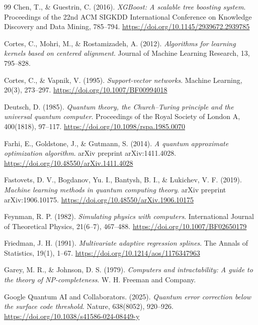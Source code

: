\begin{thebibliography}{99}
	Chen, T., \& Guestrin, C. (2016).
	\emph{XGBoost: A scalable tree boosting system}.
	Proceedings of the 22nd ACM SIGKDD International Conference on Knowledge Discovery and Data Mining, 785--794.
	\url{https://doi.org/10.1145/2939672.2939785}

	Cortes, C., Mohri, M., \& Rostamizadeh, A. (2012).
	\emph{Algorithms for learning kernels based on centered alignment}.
	Journal of Machine Learning Research, 13, 795--828.

	Cortes, C., \& Vapnik, V. (1995).
	\emph{Support-vector networks}.
	Machine Learning, 20(3), 273--297.
	\url{https://doi.org/10.1007/BF00994018}

	Deutsch, D. (1985).
	\emph{Quantum theory, the Church--Turing principle and the universal quantum computer}.
	Proceedings of the Royal Society of London A, 400(1818), 97--117.
	\url{https://doi.org/10.1098/rspa.1985.0070}

	Farhi, E., Goldstone, J., \& Gutmann, S. (2014).
	\emph{A quantum approximate optimization algorithm}.
	arXiv preprint arXiv:1411.4028.
	\url{https://doi.org/10.48550/arXiv.1411.4028}

	Fastovets, D. V., Bogdanov, Yu. I., Bantysh, B. I., \& Lukichev, V. F. (2019).
	\emph{Machine learning methods in quantum computing theory}.
	arXiv preprint arXiv:1906.10175.
	\url{https://doi.org/10.48550/arXiv.1906.10175}

	Feynman, R. P. (1982).
	\emph{Simulating physics with computers}.
	International Journal of Theoretical Physics, 21(6--7), 467--488.
	\url{https://doi.org/10.1007/BF02650179}

	Friedman, J. H. (1991).
	\emph{Multivariate adaptive regression splines}.
	The Annals of Statistics, 19(1), 1--67.
	\url{https://doi.org/10.1214/aos/1176347963}

	Garey, M. R., \& Johnson, D. S. (1979).
	\emph{Computers and intractability: A guide to the theory of NP-completeness}.
	W. H. Freeman and Company.

	Google Quantum AI and Collaborators. (2025).
	\emph{Quantum error correction below the surface code threshold}.
	Nature, 638(8052), 920--926.
	\url{https://doi.org/10.1038/s41586-024-08449-y}


\end{thebibliography}
